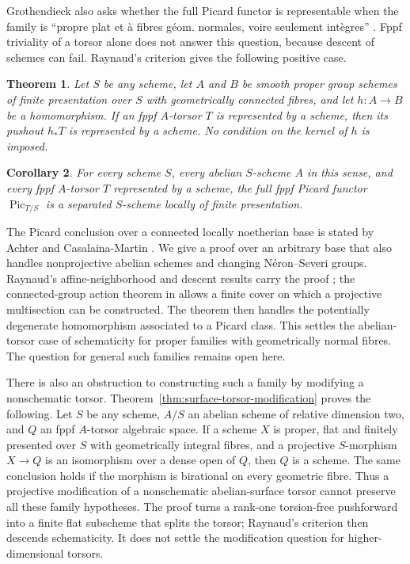 \documentclass[11pt]{article}
\newtheorem{theorem}{Theorem}[section]
\newtheorem{corollary}[theorem]{Corollary}
\theoremstyle{remark}\newtheorem{remark}[theorem]{Remark}
\newcommand{\Pic}{\operatorname{Pic}}
\begin{document}
Grothendieck also asks whether the full Picard functor is representable when the family is ``propre plat et à fibres géom. normales, voire seulement intègres'' \cite[cote~57, sheet~314; PDF p.~315]{Groth57}. Fppf triviality of a torsor alone does not answer this question, because descent of schemes can fail. Raynaud's criterion gives the following positive case.

\begin{theorem}\label{thm:schematic-abelian-pushout}
Let $S$ be any scheme, let $A$ and $B$ be smooth proper group schemes of finite presentation over $S$ with geometrically connected fibres, and let $h:A\to B$ be a homomorphism. If an fppf $A$-torsor $T$ is represented by a scheme, then its pushout $h_*T$ is represented by a scheme. No condition on the kernel of $h$ is imposed.
\end{theorem}

\begin{corollary}\label{cor:picard-schematic-abelian-torsor}
For every scheme $S$, every abelian $S$-scheme $A$ in this sense, and every fppf $A$-torsor $T$ represented by a scheme, the full fppf Picard functor $\Pic_{T/S}$ is a separated $S$-scheme locally of finite presentation.
\end{corollary}

The Picard conclusion over a connected locally noetherian base is stated by Achter and Casalaina-Martin \cite[\S1.7.2, first paragraph, p.~13]{ACMPrym}. We give a proof over an arbitrary base that also handles nonprojective abelian schemes and changing N\'eron--Severi groups. Raynaud's affine-neighborhood and descent results carry the proof \cite[Corollary~3.8 and Theorem~4.2]{RaynaudDescent}; the connected-group action theorem in \cite[\S6.6, Theorem~2]{BLR} allows a finite cover on which a projective multisection can be constructed. The theorem then handles the potentially degenerate homomorphism associated to a Picard class. This settles the abelian-torsor case of schematicity for proper families with geometrically normal fibres. The question for general such families remains open here.

There is also an obstruction to constructing such a family by modifying a nonschematic torsor. Theorem~\ref{thm:surface-torsor-modification} proves the following. Let $S$ be any scheme, $A/S$ an abelian scheme of relative dimension two, and $Q$ an fppf $A$-torsor algebraic space. If a scheme $X$ is proper, flat and finitely presented over $S$ with geometrically integral fibres, and a projective $S$-morphism $X\to Q$ is an isomorphism over a dense open of $Q$, then $Q$ is a scheme. The same conclusion holds if the morphism is birational on every geometric fibre. Thus a projective modification of a nonschematic abelian-surface torsor cannot preserve all these family hypotheses. The proof turns a rank-one torsion-free pushforward into a finite flat subscheme that splits the torsor; Raynaud's criterion then descends schematicity. It does not settle the modification question for higher-dimensional torsors.
\end{document}
